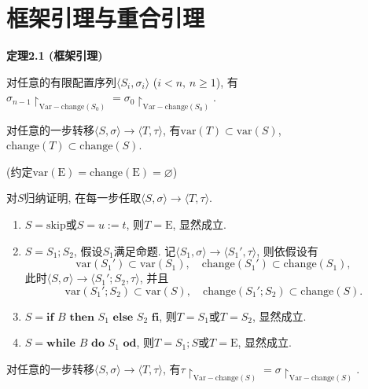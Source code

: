 \documentclass[UTF8]{ctexart}
\begin{document}
\newpage

\section{框架引理与重合引理}

\hypertarget{sec:定理2.1}{}
\noindent\textbf{定理2.1 (框架引理)}

对任意的有限配置序列$\langle S_i,\sigma_i\rangle$ ($i<n,\,n\geqslant 1$), 有
$\sigma_{n-1}\!\restriction_{\mathrm{Var}-\mathrm{change}(S_0)}=
\sigma_0\!\restriction_{\mathrm{Var}-\mathrm{change}(S_0)}$.


\vspace{1pt}\hspace{-1em}
对任意的一步转移$\langle S,\sigma\rangle\to\langle T,\tau\rangle$,
有$\mathrm{var}(T)\subset\mathrm{var}(S)$,
$\mathrm{change}(T)\subset\mathrm{change}(S)$.

(约定$\mathrm{var}(\mathrm{E})=\mathrm{change}(\mathrm{E})=\varnothing$)

\vspace{3pt}
对$S$归纳证明, 在每一步任取$\langle S,\sigma\rangle\to\langle T,\tau\rangle$.
\begin{enumerate}
    \item $S=\mathrm{skip}$或$S=u:=t$, 则$T=\mathrm{E}$, 显然成立.
    \item $S=S_1;S_2$, 假设$S_1$满足命题. 记$\langle S_1,\sigma\rangle\to
    \langle S_1',\tau\rangle$, 则依假设有
    \[
        \mathrm{var}(S_1')\subset\mathrm{var}(S_1),\quad
        \mathrm{change}(S_1')\subset\mathrm{change}(S_1),
    \]
    此时$\langle S,\sigma\rangle\to\langle S_1';S_2,\tau\rangle$, 并且
    \[
        \mathrm{var}(S_1';S_2)\subset\mathrm{var}(S),\quad
        \mathrm{change}(S_1';S_2)\subset\mathrm{change}(S).
    \]
    \item $S=\mathbf{if}\,\,B\,\,\mathbf{then}\,\,S_1\,\,\mathbf{else}\,\,
    S_2\,\,\mathbf{fi}$, 则$T=S_1$或$T=S_2$, 显然成立.
    \item $S=\mathbf{while}\,\,B\,\,\mathbf{do}\,\,S_1\,\,\mathbf{od}$,
    则$T=S_1;S$或$T=\mathrm{E}$, 显然成立.
\end{enumerate}

\vspace{5pt}\hspace{-1em}
对任意的一步转移$\langle S,\sigma\rangle\to\langle T,\tau\rangle$,
有$\tau\!\restriction_{\mathrm{Var}-\mathrm{change}(S)}=
\sigma\!\restriction_{\mathrm{Var}-\mathrm{change}(S)}$.
\end{document}
